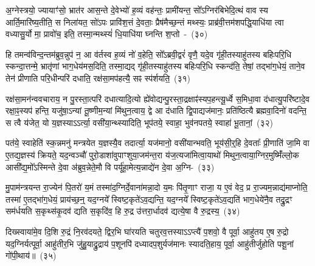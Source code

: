 {\anuvakamend[{आ॒साद्य॒ प्रान॑तिदृश्ञं करोति हरति वियु॒याद्यज॑मानमे॒वाग्निरिति॑ स॒प्तद॑श च}]}

अ॒ग्नेस्त्रयो॒ ज्यायाꣳ॑सो॒ भ्रात॑र आस॒न्ते दे॒वेभ्यो॑ ह॒व्यं वह॑न्तः॒ प्रामी॑यन्त॒ सो᳚\-ऽग्निर॑बिभेदि॒त्थं वाव स्य आर्ति॒मारि॑ष्य॒तीति॒ स निला॑यत॒ सो॑\-ऽपः प्रावि॑श॒त्तं दे॒वताः॒ प्रैष॑मैच्छ॒न्तं मथ्स्यः॒ प्राब्र॑वी॒त्तम॑शपद्धि॒याधि॑या त्वा वध्यासु॒र्यो मा॒ प्रावो॑च॒ इति॒ तस्मा॒न्मथ्स्यं॑ धि॒याधि॑या घ्नन्ति श॒प्तो~-~(३०)\ip

हि तमन्व॑विन्द॒न्तम॑ब्रुव॒न्नुप॑ न॒ आ व॑र्तस्व ह॒व्यं नो॑ व॒हेति॒ सो᳚\-ऽब्रवी॒द्वरं॑ वृणै॒ यदे॒व गृ॑ही॒तस्याहु॑तस्य बहिःपरि॒धि स्कन्दा॒त्तन्मे॒ भ्रातृ॑णां भाग॒\-धेय॑मस॒दिति॒ तस्मा॒द्यद् गृ॑ही॒तस्याहु॑तस्य बहिःपरि॒धि स्कन्द॑ति॒ तेषां॒ तद्भा॑ग॒धेयं॒ ताने॒व तेन॑ प्रीणाति परि॒धीन्परि॑ दधाति॒ रक्ष॑सा॒मप॑हत्यै॒ सꣴ स्प॑र्\mbox{}शयति॒~(३१)\ip

रक्ष॑सा॒मन॑न्ववचाराय॒ न पु॒रस्ता॒त्परि॑ दधात्यादि॒त्यो ह्ये॑वोद्यन्पु॒रस्ता॒द्\-रक्षाꣴ॑स्यप॒हन्त्यू॒र्ध्वे स॒मिधा॒वा द॑धात्यु॒परि॑ष्टादे॒व रक्षा॒ꣴ॒स्यप॑ हन्ति॒ यजु॑षा॒\-ऽन्यां तू॒ष्णीम॒न्यां मि॑थुन॒त्वाय॒ द्वे आ द॑धाति द्वि॒पाद्यज॑मानः॒ प्रति॑ष्ठित्यै ब्रह्मवा॒दिनो॑ वदन्ति॒ स त्वै य॑जेत॒ यो य॒ज्ञस्या\-ऽऽ\-र्त्या॒ वसी॑या॒न्थ्स्यादिति॒ भूप॑तये॒ स्वाहा॒ भुव॑नपतये॒ स्वाहा॑ भू॒तानां॒~(३२)\ip

पत॑ये॒ स्वाहेति॑ स्क॒न्नमनु॑ मन्त्रयेत य॒ज्ञस्यै॒व तदार्त्या॒ यज॑मानो॒ वसी॑यान्भवति॒ भूय॑सी॒र्॒\mbox{}हि दे॒वताः᳚ प्री॒णाति॑ जा॒मि वा ए॒तद्य॒ज्ञस्य॑ क्रियते॒ यद॒न्वञ्चौ॑ पुरो॒डाशा॑वुपाꣳशुया॒जम॑\-न्त॒रा य॑ज॒त्यजा॑मित्वा॒याथो॑ मिथुन॒त्वाया॒ग्निर॒मुष्मिँ॑ल्लो॒क आसी᳚द्य॒मो᳚\-ऽस्मिन्ते दे॒वा अ॑ब्रुव॒न्नेते॒मौ वि पर्यू॑हा॒मेत्य॒न्नाद्ये॑न दे॒वा अ॒ग्नि-~(३३)\ip

मु॒पाम॑न्त्रयन्त रा॒ज्येन॑ पि॒तरो॑ य॒मं तस्मा॑द॒ग्निर्दे॒वाना॑मन्ना॒दो य॒मः पि॑तृ॒णाꣳ राजा॒ य ए॒वं वेद॒ प्र रा॒ज्यम॒न्नाद्य॑माप्नोति॒ तस्मा॑ ए॒तद्भा॑ग॒धेयं॒ प्राय॑च्छ॒न्॒ यद॒ग्नये᳚ स्विष्ट॒कृते॑\-ऽव॒द्यन्ति॒ यद॒ग्नये᳚ स्विष्ट॒कृते॑\-ऽव॒द्यति॑ भाग॒\-धेये॑नै॒व तद्रु॒द्रꣳ सम॑र्धयति स॒कृथ्स॑कृ॒दव॑ द्यति स॒कृदि॑व॒ हि रु॒द्र उ॑त्तरा॒र्धादव॑ द्यत्ये॒षा वै रु॒द्रस्य॒~(३४)\ip

दिख्स्वाया॑मे॒व दि॒शि रु॒द्रं नि॒रव॑दयते॒ द्विर॒भि घा॑रयति चतुरव॒त्तस्या\-ऽऽ\-प्त्यै॑ प॒शवो॒ वै पूर्वा॒ आहु॑तय ए॒ष रु॒द्रो यद॒ग्निर्यत्पूर्वा॒ आहु॑तीर॒भि जु॑हु॒याद्रु॒द्राय॑ प॒शूनपि॑ दध्यादप॒शुर्यज॑मानः स्यादति॒हाय॒ पूर्वा॒ आहु॑तीर्जुहोति पशू॒नां गो॑पी॒थाय॑॥~(३५)\ip

{}

